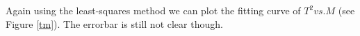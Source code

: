     Again using the least-squares method we can plot the fitting curve of $T^2 vs. M$ (see Figure \ref{tm}). The errorbar is still not clear though.

